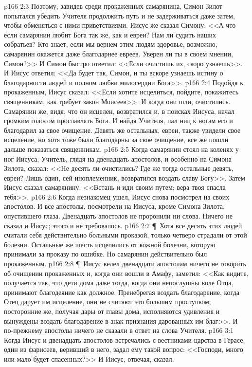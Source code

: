 \vs p166 2:3 Поэтому, завидев среди прокаженных самарянина, Симон Зилот попытался убедить Учителя продолжить путь и не задерживаться даже затем, чтобы обменяться с ними приветствиями. Иисус же сказал Симону: <<А что если самарянин любит Бога так же, как и евреи? Нам ли судить наших собратьев? Кто знает, если мы вернем этим людям здоровье, возможно, самарянин окажется даже благодарнее евреев. Уверен ли ты в своем мнении, Симон?>> И Симон быстро ответил: <<Если очистишь их, скоро узнаешь>>. И Иисус ответил: <<Да будет так, Симон, и ты вскоре узнаешь истину о благодарности людей и полном любви милосердии Бога>>.
\vs p166 2:4 Подойдя к прокаженным, Иисус сказал: <<Если хотите исцелиться, пойдите, покажитесь священникам, как требует закон Моисеев>>. И когда они шли, очистились. Самарянин же, видя, что он исцелен, возвратился и, в поисках Иисуса, начал громким голосом прославлять Бога. И найдя Учителя, пал ниц к ногам его и благодарил за свое очищение. Девять же остальных, евреи, также увидели свое исцеление, но хотя тоже были благодарны за свое очищение, все же пошли дальше показаться священникам.
\vs p166 2:5 Когда самарянин стоял на коленях у ног Иисуса, Учитель, глядя на двенадцать апостолов, и особенно на Симона Зилота, сказал: <<Не десять ли очистились? Где же тогда остальные девять, евреи? Лишь один, сей иноплеменник, возвратился воздать славу Богу>>. Затем Иисус сказал самарянину: <<Встань и иди своим путем; вера твоя спасла тебя>>.
\vs p166 2:6 Когда незнакомец ушел, Иисус снова посмотрел на своих апостолов. И все апостолы, посмотрели на Иисуса, кроме Симона Зилота, опустившего глаза. Двенадцать апостолов не проронили ни слова. Ничего не сказал и Иисус; этого и не требовалось.
\vs p166 2:7 \P\ Хотя все десять этих людей считали себя действительно больными проказой, только четверо страдали от этой болезни. Остальные же шесть исцелились от кожной болезни, которую принимали за проказу по ошибке. Но самарянин действительно был прокаженным.
\vs p166 2:8 \P\ Иисус велел двенадцати апостолам ничего не говорить об очищении прокаженных и, когда они вошли в Амафу, заметил: <<Как видите, получается так, что дети дома даже тогда, когда они непослушны воле Отца, принимают благодеяние как должное. Пренебрегая воздать благодарение, когда Отец дарует им исцеление, они не считают это большим проступком; посторонние же, получая дары от главы дома, исполняются удивления и вынуждены воздать благодарение в знак признания дарованных им благ>>. И по\hyp{}прежнему апостолы ничего не сказали в ответ на слова Учителя.
\vs p166 3:1 Когда Иисус и двенадцать апостолов встречались с вестниками царства в Герасе, один из фарисеев, веривший в него, задал ему такой вопрос: <<Господи, много или мало будет спасенных?>> И Иисус, отвечая, сказал:

